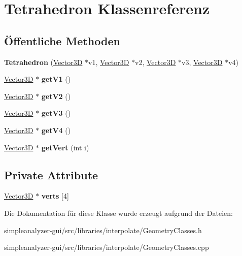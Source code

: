 \hypertarget{classTetrahedron}{\section{Tetrahedron Klassenreferenz}
\label{classTetrahedron}
}
\subsection*{Öffentliche Methoden}
\begin{DoxyCompactItemize}
\item 
\hypertarget{classTetrahedron_a84e19dba5735a455269abca8229b4bb4}{{\bfseries Tetrahedron} (\hyperlink{classVector3D}{Vector3\-D} $\ast$v1, \hyperlink{classVector3D}{Vector3\-D} $\ast$v2, \hyperlink{classVector3D}{Vector3\-D} $\ast$v3, \hyperlink{classVector3D}{Vector3\-D} $\ast$v4)}\label{classTetrahedron_a84e19dba5735a455269abca8229b4bb4}

\item 
\hypertarget{classTetrahedron_add51e42ab17afbd023d47a436ce24b0d}{\hyperlink{classVector3D}{Vector3\-D} $\ast$ {\bfseries get\-V1} ()}\label{classTetrahedron_add51e42ab17afbd023d47a436ce24b0d}

\item 
\hypertarget{classTetrahedron_aa728c967f17e2b8408009b5f2b77a17a}{\hyperlink{classVector3D}{Vector3\-D} $\ast$ {\bfseries get\-V2} ()}\label{classTetrahedron_aa728c967f17e2b8408009b5f2b77a17a}

\item 
\hypertarget{classTetrahedron_aa539a97f133ea621520121acb2ef4a7e}{\hyperlink{classVector3D}{Vector3\-D} $\ast$ {\bfseries get\-V3} ()}\label{classTetrahedron_aa539a97f133ea621520121acb2ef4a7e}

\item 
\hypertarget{classTetrahedron_a7308b7b73edeba7782dff551a03095bf}{\hyperlink{classVector3D}{Vector3\-D} $\ast$ {\bfseries get\-V4} ()}\label{classTetrahedron_a7308b7b73edeba7782dff551a03095bf}

\item 
\hypertarget{classTetrahedron_a791cea462ef057ef949c16a6db5a37c0}{\hyperlink{classVector3D}{Vector3\-D} $\ast$ {\bfseries get\-Vert} (int i)}\label{classTetrahedron_a791cea462ef057ef949c16a6db5a37c0}

\end{DoxyCompactItemize}
\subsection*{Private Attribute}
\begin{DoxyCompactItemize}
\item 
\hypertarget{classTetrahedron_a4bb7ad83965859998a622b35a97ad935}{\hyperlink{classVector3D}{Vector3\-D} $\ast$ {\bfseries verts} \mbox{[}4\mbox{]}}\label{classTetrahedron_a4bb7ad83965859998a622b35a97ad935}

\end{DoxyCompactItemize}


Die Dokumentation für diese Klasse wurde erzeugt aufgrund der Dateien\-:\begin{DoxyCompactItemize}
\item 
simpleanalyzer-\/gui/src/libraries/interpolate/Geometry\-Classes.\-h\item 
simpleanalyzer-\/gui/src/libraries/interpolate/Geometry\-Classes.\-cpp\end{DoxyCompactItemize}
